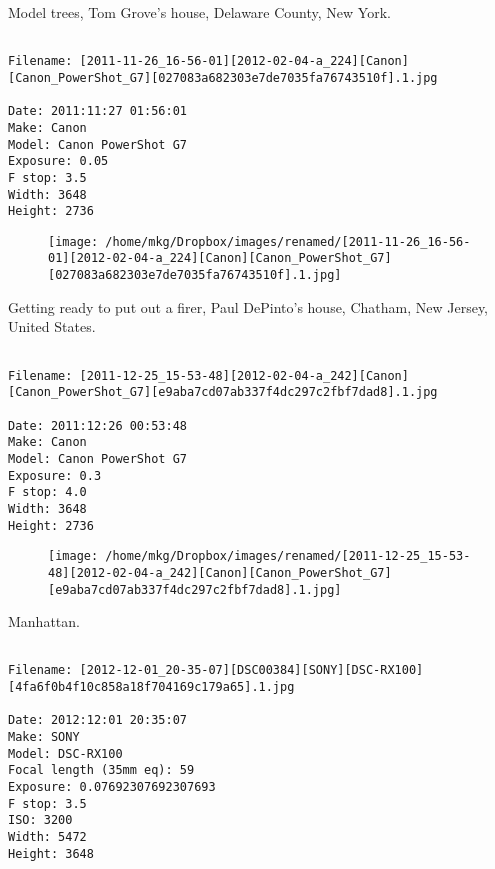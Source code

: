\clearpage
\onecolumn
\noindent Model trees, Tom Grove's house, Delaware County, New York.
\noindent
\begin{lstlisting}

Filename: [2011-11-26_16-56-01][2012-02-04-a_224][Canon][Canon_PowerShot_G7][027083a682303e7de7035fa76743510f].1.jpg

Date: 2011:11:27 01:56:01
Make: Canon
Model: Canon PowerShot G7
Exposure: 0.05
F stop: 3.5
Width: 3648
Height: 2736
\end{lstlisting}
\clearpage

\begin{figure}
\texttt{[image: /home/mkg/Dropbox/images/renamed/[2011-11-26\_16-56-01][2012-02-04-a\_224][Canon][Canon\_PowerShot\_G7][027083a682303e7de7035fa76743510f].1.jpg]}
\end{figure}
    
\clearpage
\onecolumn
\noindent Getting ready to put out a firer, Paul DePinto's house, Chatham, New Jersey, United States.
\noindent
\begin{lstlisting}

Filename: [2011-12-25_15-53-48][2012-02-04-a_242][Canon][Canon_PowerShot_G7][e9aba7cd07ab337f4dc297c2fbf7dad8].1.jpg

Date: 2011:12:26 00:53:48
Make: Canon
Model: Canon PowerShot G7
Exposure: 0.3
F stop: 4.0
Width: 3648
Height: 2736
\end{lstlisting}
\clearpage

\begin{figure}
\texttt{[image: /home/mkg/Dropbox/images/renamed/[2011-12-25\_15-53-48][2012-02-04-a\_242][Canon][Canon\_PowerShot\_G7][e9aba7cd07ab337f4dc297c2fbf7dad8].1.jpg]}
\end{figure}
    
\clearpage
\onecolumn
\noindent Manhattan.
\noindent
\begin{lstlisting}

Filename: [2012-12-01_20-35-07][DSC00384][SONY][DSC-RX100][4fa6f0b4f10c858a18f704169c179a65].1.jpg

Date: 2012:12:01 20:35:07
Make: SONY
Model: DSC-RX100
Focal length (35mm eq): 59
Exposure: 0.07692307692307693
F stop: 3.5
ISO: 3200
Width: 5472
Height: 3648
\end{lstlisting}
\clearpage

